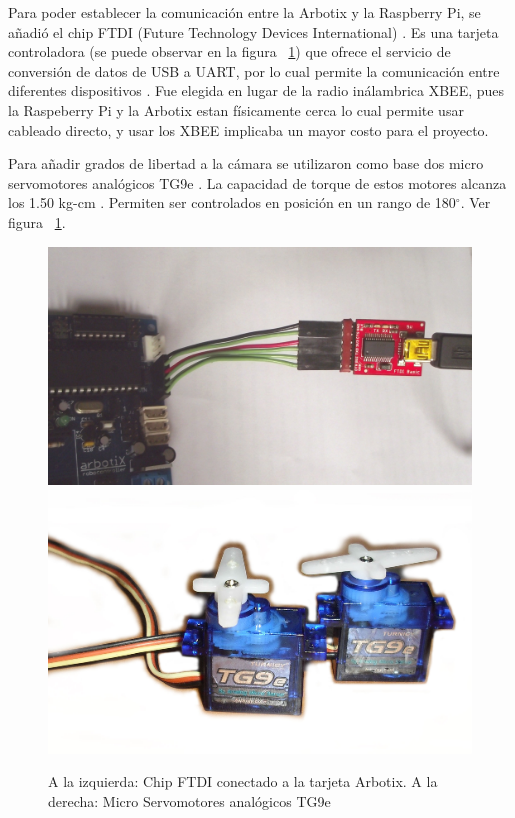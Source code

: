 
Para poder establecer la comunicación entre la Arbotix y la Raspberry Pi, se añadió el chip FTDI (Future Technology Devices International) \cite{ftdi}. Es una tarjeta controladora  (se puede observar en la figura ~\ref{fig:ftdiYservo}) que ofrece el servicio de conversión de  datos de \gls{USB} a \gls{UART}, por lo cual permite la comunicación entre diferentes dispositivos \cite{ftdi}. Fue elegida en lugar de la radio inálambrica \gls{XBEE}, pues la Raspeberry Pi y la Arbotix estan f\'isicamente cerca lo cual permite usar cableado directo, y usar los \gls{XBEE} implicaba un mayor costo para el proyecto.

Para añadir grados de libertad a la c\'amara se utilizaron como base dos micro servomotores anal\'ogicos TG9e \cite{microservo}. La capacidad de torque de estos motores alcanza los 1.50 kg-cm . Permiten ser controlados en posición en un rango de 180$^{\circ}$. Ver figura ~\ref{fig:ftdiYservo}.   

\begin{figure}[hbtp]
\centering
\includegraphics[scale=0.09]{imagenes/DSCF1162.jpg}
\includegraphics[scale=0.09]{imagenes/servosTg9B.jpg}
\caption{A la izquierda: Chip FTDI conectado a la tarjeta Arbotix. A la derecha: Micro Servomotores analógicos TG9e}
\label{fig:ftdiYservo}
\end{figure}


